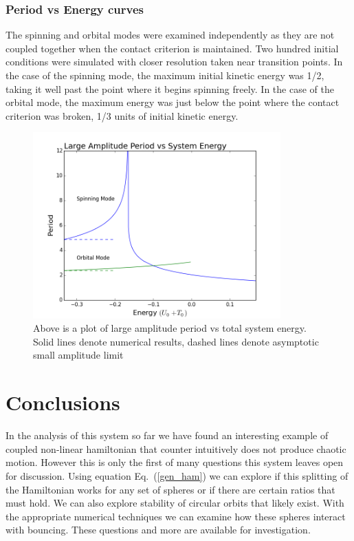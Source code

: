 \documentclass[prbg,preprint]{revtex4-1}
\begin{document}
\subsubsection{Period vs Energy curves}
The spinning and orbital modes were examined independently as they are not coupled together when the contact criterion is maintained. Two hundred initial conditions were simulated with closer resolution taken near transition points. In the case of the spinning mode, the maximum initial kinetic energy was 1/2, taking it well past the point where it begins spinning freely. In the case of the orbital mode, the maximum energy was just below the point where the contact criterion was broken, 1/3 units of initial kinetic energy.
\begin{figure}[h]
	\centering
	\includegraphics[width=0.85\textwidth]{./images/plot.png}
	\caption{Above is a plot of large amplitude period vs total system energy. Solid lines denote numerical results, dashed lines denote asymptotic small amplitude limit}
\end{figure}

\section{Conclusions}

In the analysis of this system so far we have found an interesting example of coupled non-linear hamiltonian that counter intuitively does not produce chaotic motion. However this is only the first of many questions this system leaves open for discussion. Using equation Eq.~(\ref{gen_ham}) we can explore if this splitting of the Hamiltonian works for any set of spheres or if there are certain ratios that must hold. We can also explore stability of circular orbits that likely exist. With the appropriate numerical techniques we can examine how these spheres interact with bouncing. These questions and more are available for investigation.
\end{document}
